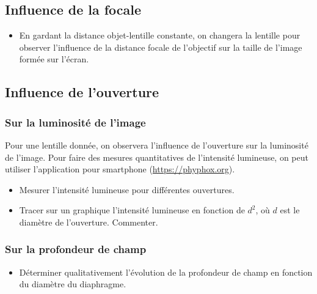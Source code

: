 \documentclass[a4paper]{tp}
\begin{document}
\subsection{Influence de la focale}%
\label{sub:influence_de_la_focale}

\begin{itemize}
\item En gardant la distance objet-lentille constante, on changera la lentille pour observer l'influence de la distance focale de l'objectif sur la taille de l'image formée sur l'écran.
\end{itemize}

\subsection{Influence de l'ouverture}%
\label{sub:influence_de_l_ouverture}

\subsubsection{Sur la luminosité de l'image}%
\label{ssub:sur_la_luminosite_de_l_image}

Pour une lentille donnée, on observera l'influence de l'ouverture sur la luminosité de l'image. Pour faire des mesures quantitatives de l'intensité lumineuse, on peut utiliser l'application pour smartphone (\url{https://phyphox.org}).
\begin{center}
\end{center}

\begin{itemize}
  \item Mesurer l'intensité lumineuse pour différentes ouvertures.
  \item Tracer sur un graphique l'intensité lumineuse en fonction de $d^2$, où $d$ est le diamètre de l'ouverture. Commenter. 
\end{itemize}

\subsubsection{Sur la profondeur de champ}%
\label{ssub:sur_la_profondeur_de_champ}
\begin{itemize}
  \item Déterminer qualitativement l'évolution de la profondeur de champ en fonction du diamètre du diaphragme.
\end{itemize}
\end{document}
